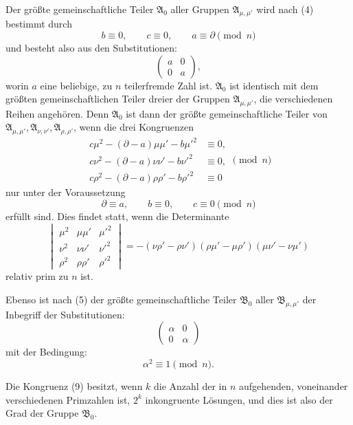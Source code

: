 \documentclass[11pt]{article}
\begin{document}
Der größte gemeinschaftliche Teiler $\mathfrak A_0$ aller Gruppen $\mathfrak A_{\mu,\mu'}$
wird nach (4) bestimmt durch
\[
 b\equiv0,
 \qquad c\equiv0,
 \qquad a\equiv\partial\pmod n
\]
und besteht also aus den Substitutionen:
\[
 \begin{pmatrix}a&0\\0&a\end{pmatrix},
\]
worin $a$ eine beliebige, zu $n$ teilerfremde Zahl ist. $\mathfrak A_0$ ist identisch mit
dem größten gemeinschaftlichen Teiler dreier der Gruppen $\mathfrak A_{\mu,\mu'}$, die
verschiedenen Reihen angehören. Denn $\mathfrak A_0$ ist dann der größte
gemeinschaftliche Teiler von
$\mathfrak A_{\mu,\mu'},\mathfrak A_{\nu,\nu'},\mathfrak A_{\rho,\rho'}$, wenn die drei Kongruenzen
\[
\begin{aligned}
 c\mu^2-(\partial-a)\mu\mu'-b\mu'^2&\equiv0,\\
 c\nu^2-(\partial-a)\nu\nu'-b\nu'^2&\equiv0,\\
 c\rho^2-(\partial-a)\rho\rho'-b\rho'^2&\equiv0
\end{aligned}
\pmod n
\]
nur unter der Voraussetzung
\[
 \partial\equiv a,
 \qquad b\equiv0,
 \qquad c\equiv0\pmod n
\]
erfüllt sind. Dies findet statt, wenn die Determinante
\[
\begin{vmatrix}
 \mu^2&\mu\mu'&\mu'^2\\
 \nu^2&\nu\nu'&\nu'^2\\
 \rho^2&\rho\rho'&\rho'^2
\end{vmatrix}
=-(\nu\rho'-\rho\nu')(\rho\mu'-\mu\rho')(\mu\nu'-\nu\mu')
\]
relativ prim zu $n$ ist.

Ebenso ist nach (5) der größte gemeinschaftliche Teiler $\mathfrak B_0$ aller
$\mathfrak B_{\mu,\mu'}$ der Inbegriff der Substitutionen:
\begin{equation}
 \begin{pmatrix}\alpha&0\\0&\alpha\end{pmatrix}
\tag{8}
\end{equation}
mit der Bedingung:
\begin{equation}
 \alpha^2\equiv1\pmod n.
\tag{9}
\end{equation}

Die Kongruenz (9) besitzt, wenn $k$ die Anzahl der in $n$ aufgehenden, voneinander
verschiedenen Primzahlen ist, $2^k$ inkongruente Lösungen, und dies ist also der Grad
der Gruppe $\mathfrak B_0$.
\end{document}
